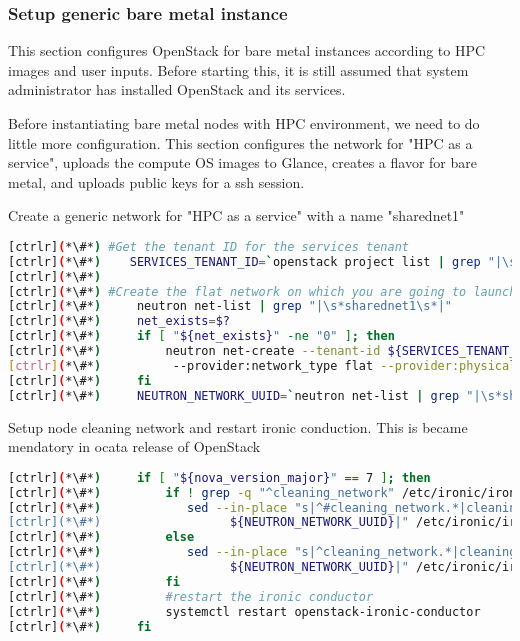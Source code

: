 \subsubsection{Setup generic bare metal instance}

	This section configures OpenStack for bare metal instances according to HPC images and user inputs. Before starting this, it is still assumed that system administrator has installed OpenStack and its services.

	Before instantiating bare metal nodes with HPC environment, we need to do little more configuration. This section configures the network for "HPC as a service", uploads the compute OS images to Glance, creates a flavor for bare metal, and uploads public keys for a ssh session.

	Create a generic network for "HPC as a service" with a name "sharednet1"

\begin{lstlisting}[language=bash,keywords={}]
[ctrlr](*\#*) #Get the tenant ID for the services tenant
[ctrlr](*\#*)    SERVICES_TENANT_ID=`openstack project list | grep "|\s*services\s*|" | awk '{print $2}'`
[ctrlr](*\#*) 
[ctrlr](*\#*) #Create the flat network on which you are going to launch instances
[ctrlr](*\#*)     neutron net-list | grep "|\s*sharednet1\s*|"
[ctrlr](*\#*)     net_exists=$?
[ctrlr](*\#*)     if [ "${net_exists}" -ne "0" ]; then
[ctrlr](*\#*)         neutron net-create --tenant-id ${SERVICES_TENANT_ID} sharednet1 --shared \
[ctrlr](*\#*)          --provider:network_type flat --provider:physical_network physnet1
[ctrlr](*\#*)     fi
[ctrlr](*\#*)     NEUTRON_NETWORK_UUID=`neutron net-list | grep "|\s*sharednet1\s*|" | awk '{print $2}'`
\end{lstlisting}

	Setup node cleaning network and restart ironic conduction. This is became mendatory in ocata release of OpenStack


\begin{lstlisting}[language=bash,keywords={}]
[ctrlr](*\#*)     if [ "${nova_version_major}" == 7 ]; then
[ctrlr](*\#*)         if ! grep -q "^cleaning_network" /etc/ironic/ironic.conf; then
[ctrlr](*\#*)            sed --in-place "s|^#cleaning_network.*|cleaning_network = \
[ctrlr](*\#*)                  ${NEUTRON_NETWORK_UUID}|" /etc/ironic/ironic.conf
[ctrlr](*\#*)         else
[ctrlr](*\#*)            sed --in-place "s|^cleaning_network.*|cleaning_network = \
[ctrlr](*\#*)                  ${NEUTRON_NETWORK_UUID}|" /etc/ironic/ironic.conf
[ctrlr](*\#*)         fi
[ctrlr](*\#*)         #restart the ironic conductor 
[ctrlr](*\#*)         systemctl restart openstack-ironic-conductor
[ctrlr](*\#*)     fi
\end{lstlisting} 

